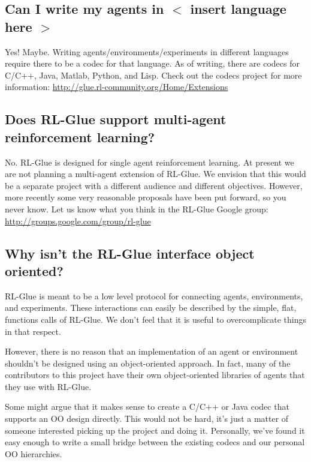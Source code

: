 \documentclass[11pt]{article}
\begin{document}
\subsection{Can I write my agents in $<$ insert language here $>$}
Yes! Maybe.  Writing agents/environments/experiments in different languages require there to be a codec for that language.  As of writing, there are codecs for C/C++, Java, Matlab, Python, and Lisp.  Check out the codecs project for more information:\newline
\url{http://glue.rl-community.org/Home/Extensions}

\subsection{Does RL-Glue support multi-agent reinforcement learning?}
 No. RL-Glue is designed for single agent reinforcement learning. At present we are not planning a multi-agent extension of RL-Glue. We envision that this would be a separate project with a different audience and different objectives.  However, more recently some very reasonable proposals have been put forward, so you never know.  Let us know what you think in the RL-Glue Google group:\newline
\url{http://groups.google.com/group/rl-glue}
 
\subsection{Why isn't the RL-Glue interface object oriented?}
RL-Glue is meant to be a low level protocol for connecting agents, environments, and experiments.  These interactions can
easily be described by the simple, flat, functions calls of RL-Glue.  We don't feel that it is useful to overcomplicate
things in that respect.

However, there is no reason that an implementation of an agent or environment shouldn't be designed using an object-oriented 
approach.  In fact, many of the contributors to this project have their own object-oriented libraries of agents that 
they use with RL-Glue.

Some might argue that it makes sense to create a C/C++ or Java codec that supports an OO design
directly.  This would not be hard, it's just a matter of someone interested picking up the project and doing it.  Personally, 
we've found it easy enough to write a small bridge between the existing codecs and our personal OO hierarchies.
\end{document}
